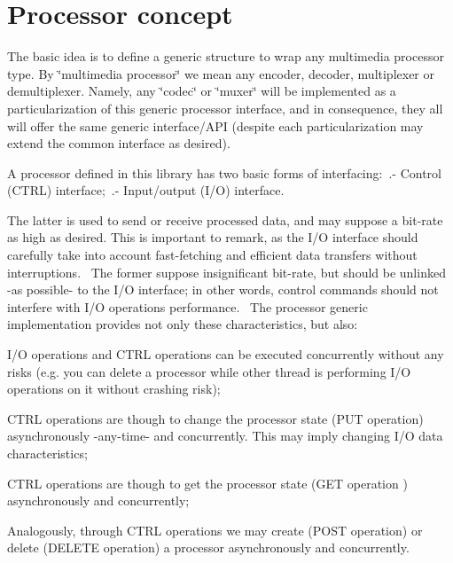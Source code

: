 \section*{Processor concept }

The basic idea is to define a generic structure to wrap any multimedia processor type. By \char`\"{}multimedia processor\char`\"{} we mean any encoder, decoder, multiplexer or demultiplexer. Namely, any \char`\"{}codec\char`\"{} or \char`\"{}muxer\char`\"{} will be implemented as a particularization of this generic processor interface, and in consequence, they all will offer the same generic interface/\+A\+PI (despite each particularization may extend the common interface as desired).

A processor defined in this library has two basic forms of interfacing\+:~.-\/ Control (C\+T\+RL) interface;~.-\/ Input/output (I/O) interface.~\newline


The latter is used to send or receive processed data, and may suppose a bit-\/rate as high as desired. This is important to remark, as the I/O interface should carefully take into account fast-\/fetching and efficient data transfers without interruptions.~\newline
 The former suppose insignificant bit-\/rate, but should be unlinked -\/as possible-\/ to the I/O interface; in other words, control commands should not interfere with I/O operations performance.~\newline
 The processor generic implementation provides not only these characteristics, but also\+:~\newline

\begin{DoxyItemize}
\item I/O operations and C\+T\+RL operations can be executed concurrently without any risks (e.\+g. you can delete a processor while other thread is performing I/O operations on it without crashing risk);~\newline

\item C\+T\+RL operations are though to change the processor state (P\+UT operation) asynchronously -\/any-\/time-\/ and concurrently. This may imply changing I/O data characteristics;~\newline

\item C\+T\+RL operations are though to get the processor state (G\+ET operation ) asynchronously and concurrently;~\newline

\item Analogously, through C\+T\+RL operations we may create (P\+O\+ST operation) or delete (D\+E\+L\+E\+TE operation) a processor asynchronously and concurrently.~\newline

\end{DoxyItemize}

